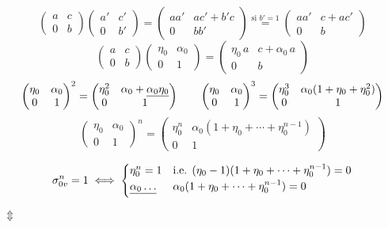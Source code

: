 \documentclass[11pt,a4paper]{article}
\begin{document}
\[
\begin{pmatrix}a & c\\ 0 & b\end{pmatrix}\begin{pmatrix}a' & c'\\ 0 & b'\end{pmatrix}
= \begin{pmatrix}aa' & ac' + b'c\\ 0 & bb'\end{pmatrix}
\overset{\text{si } b'=1}{=} \begin{pmatrix}aa' & c + ac'\\ 0 & b\end{pmatrix}
\]
\[
\begin{pmatrix}a & c\\ 0 & b\end{pmatrix}\begin{pmatrix}\eta_0 & \alpha_0\\ 0 & 1\end{pmatrix}
= \begin{pmatrix}\eta_0\,a & c + \alpha_0\,a\\ 0 & b\end{pmatrix}
\]
\[
\begin{pmatrix}\eta_0 & \alpha_0\\ 0 & 1\end{pmatrix}^2 = \begin{pmatrix}\eta_0^2 & \alpha_0 + \uncertain{\alpha_0\eta_0}\\ 0 & 1\end{pmatrix}
\qquad
\begin{pmatrix}\eta_0 & \alpha_0\\ 0 & 1\end{pmatrix}^3 = \begin{pmatrix}\eta_0^3 & \alpha_0(1 + \eta_0 + \eta_0^2)\\ 0 & 1\end{pmatrix}
\]
\[
\begin{pmatrix}\eta_0 & \alpha_0\\ 0 & 1\end{pmatrix}^n = \begin{pmatrix}\eta_0^n & \alpha_0(1 + \eta_0 + \cdots + \eta_0^{n-1})\\ 0 & 1\end{pmatrix}
\]

\[
\sigma_{0v}^n = 1 \iff
\begin{cases}
\eta_0^n = 1 & \text{i.e. } (\eta_0 - 1)(1 + \eta_0 + \cdots + \eta_0^{n-1}) = 0\\
\struck{\alpha_0 \ldots} & \alpha_0(1 + \eta_0 + \cdots + \eta_0^{n-1}) = 0
\end{cases}
\]
$\Updownarrow$
\end{document}
